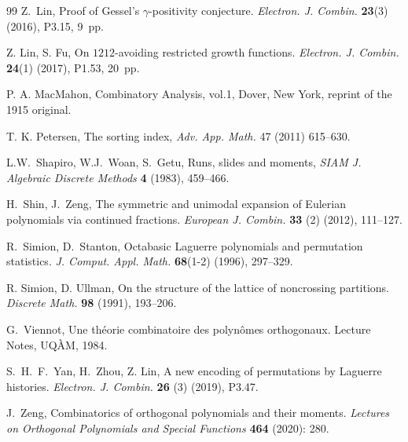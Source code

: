 \documentclass[12pt]{amsart}
\numberwithin{equation}{section}
\theoremstyle{plain}
\theoremstyle{definition}
\begin{document}
\begin{thebibliography}{99}
Z.~Lin, Proof of Gessel's $\gamma$-positivity conjecture. {\it Electron. J. Combin.} {\bf 23}(3) (2016), P3.15, 9~pp.

Z. Lin, S. Fu, On $1212$-avoiding restricted growth functions. {\it Electron. J. Combin.} {\bf 24}(1) (2017), P1.53, 20~pp.

 P. A. MacMahon, Combinatory Analysis, vol.1, Dover, New York, reprint of the 1915 original.

T. K. Petersen, The sorting index, {\it Adv. App. Math.} 47 (2011) 615--630.

L.W.~Shapiro, W.J.~Woan, S.~Getu, Runs, slides and moments, {\it SIAM J. Algebraic Discrete Methods} {\bf 4} (1983), 459--466.

H.~Shin, J.~Zeng, The symmetric and unimodal expansion of Eulerian polynomials via continued fractions. \textit{European J. Combin.} {\bf 33} (2) (2012), 111--127.


R.~Simion, D.~Stanton, Octabasic Laguerre polynomials and permutation statistics. {\it J. Comput. Appl. Math.} {\bf 68}(1-2) (1996), 297--329.

R. Simion, D. Ullman, On the structure of the lattice of noncrossing partitions. {\it Discrete Math.}
 {\bf98} (1991), 193--206.


G.~Viennot, Une th\'eorie combinatoire des polyn\^omes orthogonaux. Lecture Notes, UQ\`AM, 1984.


S.~H.~F.~Yan, H.~Zhou, Z. Lin, A new encoding of permutations by Laguerre histories. {\it Electron. J. Combin. } {\bf26} (3) (2019), P3.47.

J.~Zeng, Combinatorics of orthogonal polynomials and their moments. {\it Lectures on Orthogonal Polynomials and Special Functions} {\bf 464} (2020): 280.


\end{thebibliography}
\end{document}
